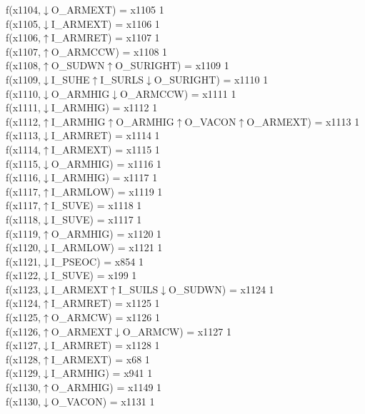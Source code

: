 f(x1104,$\downarrow$O\_ARMEXT) = x1105 {1} \\
f(x1105,$\downarrow$I\_ARMEXT) = x1106 {1} \\
f(x1106,$\uparrow$I\_ARMRET) = x1107 {1} \\
f(x1107,$\uparrow$O\_ARMCCW) = x1108 {1} \\
f(x1108,$\uparrow$O\_SUDWN$\uparrow$O\_SURIGHT) = x1109 {1} \\
f(x1109,$\downarrow$I\_SUHE$\uparrow$I\_SURLS$\downarrow$O\_SURIGHT) = x1110 {1} \\
f(x1110,$\downarrow$O\_ARMHIG$\downarrow$O\_ARMCCW) = x1111 {1} \\
f(x1111,$\downarrow$I\_ARMHIG) = x1112 {1} \\
f(x1112,$\uparrow$I\_ARMHIG$\uparrow$O\_ARMHIG$\uparrow$O\_VACON$\uparrow$O\_ARMEXT) = x1113 {1} \\
f(x1113,$\downarrow$I\_ARMRET) = x1114 {1} \\
f(x1114,$\uparrow$I\_ARMEXT) = x1115 {1} \\
f(x1115,$\downarrow$O\_ARMHIG) = x1116 {1} \\
f(x1116,$\downarrow$I\_ARMHIG) = x1117 {1} \\
f(x1117,$\uparrow$I\_ARMLOW) = x1119 {1} \\
f(x1117,$\uparrow$I\_SUVE) = x1118 {1} \\
f(x1118,$\downarrow$I\_SUVE) = x1117 {1} \\
f(x1119,$\uparrow$O\_ARMHIG) = x1120 {1} \\
f(x1120,$\downarrow$I\_ARMLOW) = x1121 {1} \\
f(x1121,$\downarrow$I\_PSEOC) = x854 {1} \\
f(x1122,$\downarrow$I\_SUVE) = x199 {1} \\
f(x1123,$\downarrow$I\_ARMEXT$\uparrow$I\_SUILS$\downarrow$O\_SUDWN) = x1124 {1} \\
f(x1124,$\uparrow$I\_ARMRET) = x1125 {1} \\
f(x1125,$\uparrow$O\_ARMCW) = x1126 {1} \\
f(x1126,$\uparrow$O\_ARMEXT$\downarrow$O\_ARMCW) = x1127 {1} \\
f(x1127,$\downarrow$I\_ARMRET) = x1128 {1} \\
f(x1128,$\uparrow$I\_ARMEXT) = x68 {1} \\
f(x1129,$\downarrow$I\_ARMHIG) = x941 {1} \\
f(x1130,$\uparrow$O\_ARMHIG) = x1149 {1} \\
f(x1130,$\downarrow$O\_VACON) = x1131 {1} \\
